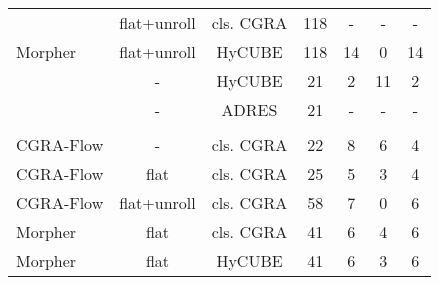 \begin{table}
{\begin{tabular}{|l|c|c|c|c|c|c|}
 \rowcolor{darkRed!50}{Morpher}                       & {flat+unroll}                        & cls. CGRA                            & 118                           & -                          & -                                   & - \\ 
 {Morpher}                                            & {flat+unroll}                        & HyCUBE                               & 118                           & 14                         & 0                                   & 14 \\
 \rowcolor{darkOrange!50}{CGRA-ME}                    & {-}                                  & HyCUBE                               & 21                            & 2                          & 11                                  & 2 \\
 \rowcolor{darkRed!50}{Pillars}                       & {-}                                  & ADRES                                & 21                            & -                          & -                                   & - \\\hline\hline
 \rowcolor{darkGray} \multicolumn{7}{|c|}{\color{white}{\textbf{GESUMMV}}} \\\hline
 {CGRA-Flow}                                          & -                                    & cls. CGRA                            & 22                            & 8                          & 6                                   & 4\\ 
 {CGRA-Flow}                                          & flat                                 & cls. CGRA                            & 25                            & 5                          & 3                                   & 4 \\ 
 {CGRA-Flow}                                          & flat+unroll                          & cls. CGRA                            & 58                            & 7                          & 0                                   & 6 \\
 {Morpher}                                            & {flat}                               & cls. CGRA                            & 41                            & 6                          & 4                                   & 6 \\ 
 {Morpher}                                            & {flat}                               & HyCUBE                               & 41                            & 6                          & 3                                   & 6 \\

\end{tabular}}
\end{table}
